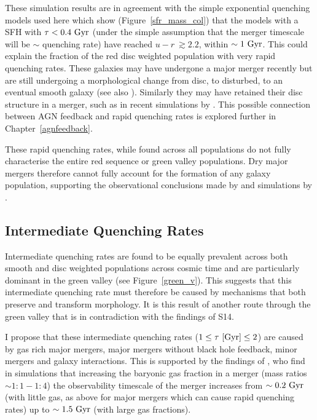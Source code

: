 These simulation results are in agreement with the simple exponential quenching models used here which show (Figure~\ref{sfr_mass_col}) that the models with a SFH with $\tau < 0.4~\rm{Gyr}$ (under the simple assumption that the merger timescale will be $\sim$ quenching rate) have reached $u-r ~\gtrsim 2.2$, within $\sim1~\rm{Gyr}$. This could explain the fraction of the red disc weighted population with very rapid quenching rates. These galaxies may have undergone a major merger recently but are still undergoing a morphological change from disc, to disturbed, to an eventual smooth galaxy (see also \citealt{vdW09}). Similarly they may have retained their disc structure in a merger, such as in recent simulations by \citet{pontzen16}. This possible connection between AGN feedback and rapid quenching rates is explored further in Chapter~\ref{agnfeedback}. 

These rapid quenching rates, while found across all populations do not fully characterise the entire red sequence or green valley populations. Dry major mergers therefore cannot fully account for the formation of any galaxy population, supporting the observational conclusions made by \citet{Bell07,Bundy07, kaviraj14a} and simulations by \citet{Genel08}. 

\subsection{Intermediate Quenching Rates}\label{int}

Intermediate quenching rates are found to be equally prevalent across both smooth and disc weighted populations across cosmic time and are particularly dominant in the green valley (see Figure~\ref{green_v}). This suggests that this intermediate quenching rate must therefore be caused by mechanisms that both preserve and transform morphology. It is this result of another route through the green valley that is in contradiction with the findings of S14. 

I propose that these intermediate quenching rates ($1 \leq \tau~\rm{[Gyr]} \leq 2$) are caused by gas rich major mergers, major mergers without black hole feedback, minor mergers and galaxy interactions. This is supported by the findings of \citet{Lotz11}, who find in simulations that increasing the baryonic gas fraction in a merger (mass ratios $\sim 1:1-1:4$) the observability timescale of the merger increases from $\sim0.2~\rm{Gyr}$ (with little gas, as above for major mergers which can cause rapid quenching rates) up to $\sim1.5~\rm{Gyr}$ (with large gas fractions). 

